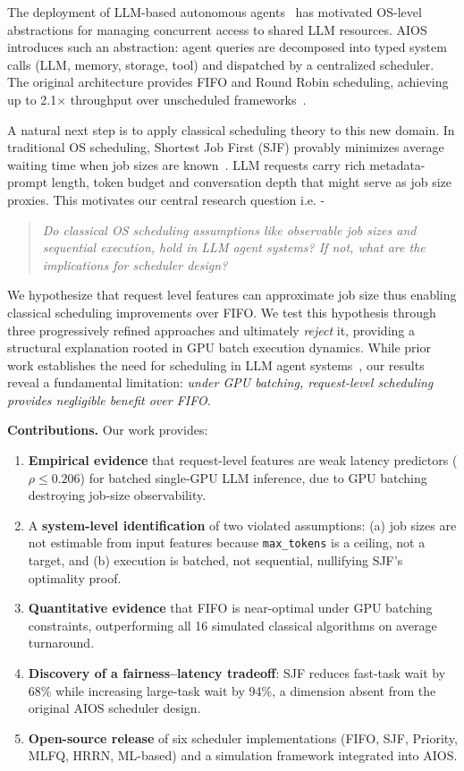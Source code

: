 \documentclass[conference]{IEEEtran}
\begin{document}
The deployment of LLM-based autonomous agents~\cite{yao2023react, shinn2023reflexion} has motivated OS-level abstractions for managing concurrent access to shared LLM resources. AIOS~\cite{mei2025aios} introduces such an abstraction: agent queries are decomposed into typed system calls (LLM, memory, storage, tool) and dispatched by a centralized scheduler. The original architecture provides FIFO and Round Robin scheduling, achieving up to 2.1$\times$ throughput over unscheduled frameworks~\cite{mei2025aios}.

A natural next step is to apply classical scheduling theory to this new domain. In traditional OS scheduling, Shortest Job First (SJF) provably minimizes average waiting time when job sizes are known~\cite{silberschatz2018os}. LLM requests carry rich metadata-prompt length, token budget and conversation depth that might serve as job size proxies. This motivates our central research question i.e. -

\begin{quote}
\textit{Do classical OS scheduling assumptions like observable job sizes and sequential execution, hold in LLM agent systems? If not, what are the implications for scheduler design?}
\end{quote}

We hypothesize that request level features can approximate job size thus enabling classical scheduling improvements over FIFO. We test this hypothesis through three progressively refined approaches and ultimately \textit{reject} it, providing a structural explanation rooted in GPU batch execution dynamics. While prior work establishes the need for scheduling in LLM agent systems~\cite{mei2025aios}, our results reveal a fundamental limitation: \textit{under GPU batching, request-level scheduling provides negligible benefit over FIFO}.

\smallskip
\noindent\textbf{Contributions.} Our work provides:

\begin{enumerate}
    \item \textbf{Empirical evidence} that request-level features are weak latency predictors ($\rho \leq 0.206$) for batched single-GPU LLM inference, due to GPU batching destroying job-size observability.
    \item A \textbf{system-level identification} of two violated assumptions: (a) job sizes are not estimable from input features because \texttt{max\_tokens} is a ceiling, not a target, and (b) execution is batched, not sequential, nullifying SJF's optimality proof.
    \item \textbf{Quantitative evidence} that FIFO is near-optimal under GPU batching constraints, outperforming all 16 simulated classical algorithms on average turnaround.
    \item \textbf{Discovery of a fairness--latency tradeoff}: SJF reduces fast-task wait by 68\% while increasing large-task wait by 94\%, a dimension absent from the original AIOS scheduler design.
    \item \textbf{Open-source release} of six scheduler implementations (FIFO, SJF, Priority, MLFQ, HRRN, ML-based) and a simulation framework integrated into AIOS.
\end{enumerate}
\end{document}
